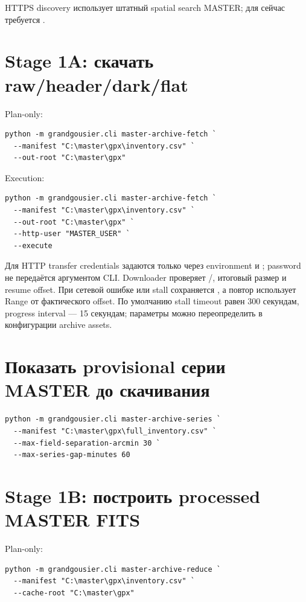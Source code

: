 HTTPS discovery использует штатный spatial search MASTER; для  сейчас требуется .

\section{Stage 1A: скачать raw/header/dark/flat}

Plan-only:

\begin{lstlisting}
python -m grandgousier.cli master-archive-fetch `
  --manifest "C:\master\gpx\inventory.csv" `
  --out-root "C:\master\gpx"
\end{lstlisting}

Execution:

\begin{lstlisting}
python -m grandgousier.cli master-archive-fetch `
  --manifest "C:\master\gpx\inventory.csv" `
  --out-root "C:\master\gpx" `
  --http-user "MASTER_USER" `
  --execute
\end{lstlisting}

Для HTTP transfer credentials задаются только через environment  и ; password не передаётся аргументом CLI. Downloader проверяет /, итоговый размер и resume offset. При сетевой ошибке или stall сохраняется , а повтор использует Range от фактического offset. По умолчанию stall timeout равен 300 секундам, progress interval --- 15 секундам; параметры можно переопределить в конфигурации archive assets.


\section{Показать provisional серии MASTER до скачивания}

\begin{verbatim}
python -m grandgousier.cli master-archive-series `
  --manifest "C:\master\gpx\full_inventory.csv" `
  --max-field-separation-arcmin 30 `
  --max-series-gap-minutes 60
\end{verbatim}

\section{Stage 1B: построить processed MASTER FITS}

Plan-only:

\begin{lstlisting}
python -m grandgousier.cli master-archive-reduce `
  --manifest "C:\master\gpx\inventory.csv" `
  --cache-root "C:\master\gpx"
\end{lstlisting}

